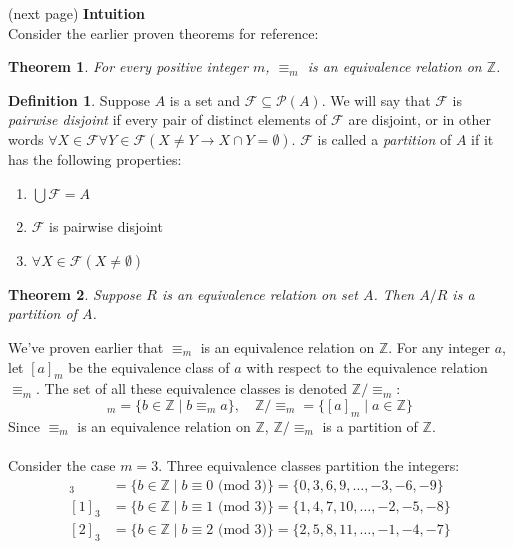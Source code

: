 \documentclass{report}
\newtheorem*{theorem}{Theorem}
\theoremstyle{definition}
\newtheorem*{definition}{Definition}
\begin{document}
\noindent(next page)\newpage
\noindent\textbf{Intuition}\\
Consider the earlier proven theorems for reference:
\begin{theorem}
For every positive integer $m$, $\equiv_m$ is an equivalence relation on $\mathbb Z$.
\end{theorem}
\begin{definition}
Suppose $A$ is a set and $\mathcal F\subseteq\mathscr P(A)$. We will say that $\mathcal F$ is \textit{pairwise disjoint} if every pair of distinct elements of $\mathcal F$ are disjoint, or in other
words $\forall X\in\mathcal F\forall Y\in\mathcal F(X\neq Y\to X\cap Y=\emptyset)$. $\mathcal F$ is called a \textit{partition} of $A$ if it has the following properties:
\begin{enumerate}
\item $\bigcup\mathcal F=A$
\item $\mathcal F$ is pairwise disjoint
\item $\forall X\in\mathcal F(X\neq\emptyset)$
\end{enumerate}
\end{definition}
\begin{theorem}
Suppose $R$ is an equivalence relation on set $A$. Then $A/R$ is a partition of $A$.
\end{theorem}
\noindent We've proven earlier that $\equiv_m$ is an equivalence relation on $\mathbb Z$. For any integer $a$, let $[a]_m$ be the equivalence class of $a$ with respect to the equivalence
relation $\equiv_m$. The set of all these equivalence classes is denoted $\mathbb Z/\equiv_m$:
\begin{equation*}
[a]_m=\{b\in\mathbb Z\mid b\equiv_m a\},\quad\mathbb Z/\equiv_m=\{[a]_m\mid a\in\mathbb Z\}
\end{equation*}
Since $\equiv_m$ is an equivalence relation on $\mathbb Z$, $\mathbb Z/\equiv_m$ is a partition of $\mathbb Z$.\\
\vspace{1mm}\\
Consider the case $m=3$. Three equivalence classes partition the integers:
\begin{align*}
[0]_3&=\{b\in\mathbb Z\mid b\equiv0\text{ (mod 3)}\}=\{0,3,6,9,\ldots,-3,-6,-9\}\\
[1]_3&=\{b\in\mathbb Z\mid b\equiv1\text{ (mod 3)}\}=\{1,4,7,10,\ldots,-2,-5,-8\}\\
[2]_3&=\{b\in\mathbb Z\mid b\equiv2\text{ (mod 3)}\}=\{2,5,8,11,\ldots,-1,-4,-7\}
\end{align*}
\end{document}
